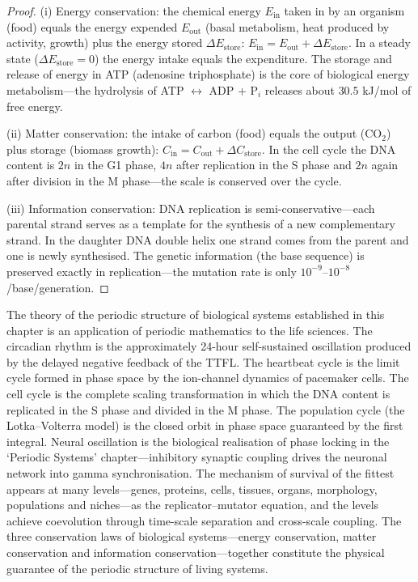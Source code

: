 \begin{proof}
(i) Energy conservation: the chemical energy $E_{\text{in}}$ taken in by an organism (food) equals the energy expended $E_{\text{out}}$ (basal metabolism, heat produced by activity, growth) plus the energy stored $\Delta E_{\text{store}}$: $E_{\text{in}} = E_{\text{out}} + \Delta E_{\text{store}}$. In a steady state ($\Delta E_{\text{store}} = 0$) the energy intake equals the expenditure. The storage and release of energy in ATP (adenosine triphosphate) is the core of biological energy metabolism---the hydrolysis of ATP $\leftrightarrow$ ADP $+$ P$_i$ releases about $30.5$ kJ/mol of free energy.

(ii) Matter conservation: the intake of carbon (food) equals the output (CO$_2$) plus storage (biomass growth): $C_{\text{in}} = C_{\text{out}} + \Delta C_{\text{store}}$. In the cell cycle the DNA content is $2n$ in the G1 phase, $4n$ after replication in the S phase and $2n$ again after division in the M phase---the scale is conserved over the cycle.

(iii) Information conservation: DNA replication is semi-conservative---each parental strand serves as a template for the synthesis of a new complementary strand. In the daughter DNA double helix one strand comes from the parent and one is newly synthesised. The genetic information (the base sequence) is preserved exactly in replication---the mutation rate is only $10^{-9}$--$10^{-8}$/base/generation.
\end{proof}

\begin{remark}
The theory of the periodic structure of biological systems established in this chapter is an application of periodic mathematics to the life sciences. The circadian rhythm is the approximately 24-hour self-sustained oscillation produced by the delayed negative feedback of the TTFL. The heartbeat cycle is the limit cycle formed in phase space by the ion-channel dynamics of pacemaker cells. The cell cycle is the complete scaling transformation in which the DNA content is replicated in the S phase and divided in the M phase. The population cycle (the Lotka--Volterra model) is the closed orbit in phase space guaranteed by the first integral. Neural oscillation is the biological realisation of phase locking in the `Periodic Systems' chapter---inhibitory synaptic coupling drives the neuronal network into gamma synchronisation. The mechanism of survival of the fittest appears at many levels---genes, proteins, cells, tissues, organs, morphology, populations and niches---as the replicator--mutator equation, and the levels achieve coevolution through time-scale separation and cross-scale coupling. The three conservation laws of biological systems---energy conservation, matter conservation and information conservation---together constitute the physical guarantee of the periodic structure of living systems.
\end{remark}

